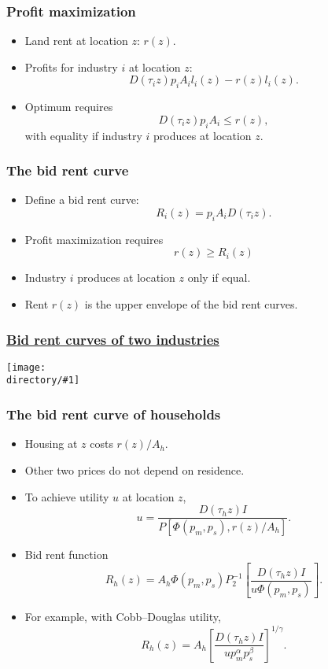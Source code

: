 \documentclass[handout,compress,mathserif]{beamer}
\newcommand{\directory}{figures}
\newcommand{\widefigure}[2]{\begin{frame}\frametitle{\hyperlink{#1back}{#2}}\hypertarget{#1}{{\begin{center}\texttt{[image: \\directory/\#1]}\end{center}}}\end{frame}}
\begin{document}
\begin{frame}\frametitle{Profit maximization}
\begin{itemize}
    \item Land rent at location $z$: $r(z)$.
    \item Profits for industry $i$ at location $z$:
    \[
    D(\tau_i z) p_i A_i l_i(z) - r(z)l_i(z).
    \]
    \item Optimum requires
    \[
    D(\tau_i z) p_i A_i \le r(z),
    \]
    with equality if industry $i$ produces at location $z$.
\end{itemize}
\end{frame}

\begin{frame}\frametitle{The bid rent curve}
\begin{itemize}
    \item Define a bid rent curve:
    \[
    R_i(z) = p_iA_iD(\tau_i z).
    \]
    \item Profit maximization requires
    \[
    r(z)\ge R_i(z)
    \]
    \item Industry $i$ produces at location $z$ only if equal.
    \item Rent $r(z)$ is the upper envelope of the bid rent curves.
\end{itemize}
\end{frame}

\widefigure{bid-rent-2}{Bid rent curves of two industries}

\begin{frame}\frametitle{The bid rent curve of households}
\begin{itemize}
    \item Housing at $z$ costs $r(z)/A_h$.
    \item Other two prices do not depend on residence.
    \item To achieve utility $u$ at location $z$,
    \[
    u = \frac{D(\tau_h z) I}{P[\Phi(p_m,p_s),r(z)/A_h]}.
    \]
    \item Bid rent function
    \[
    R_h(z) = A_h\Phi(p_m,p_s)P_2^{-1}\left[\frac{D(\tau_h z) I}{u\Phi(p_m,p_s)}\right].
    \]
	\item For example, with Cobb--Douglas utility,
\[
R_h(z) = A_h\left[\frac{D(\tau_h z) I}{up_m^{\alpha}p_s^{\beta}}\right]^{1/\gamma}.
\]
\end{itemize}
\end{frame}
\end{document}
